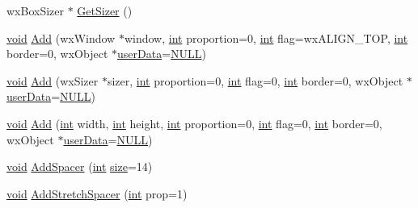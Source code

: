 \begin{DoxyCompactItemize}
\item 
wx\+Box\+Sizer $\ast$ \hyperlink{class_tool_bar_aafe722aa7397117a105aedf25ca20db0}{Get\+Sizer} ()
\item 
\hyperlink{sound_8c_ae35f5844602719cf66324f4de2a658b3}{void} \hyperlink{class_tool_bar_a3a8144425c56a59cec380131d90efa37}{Add} (wx\+Window $\ast$window, \hyperlink{xmltok_8h_a5a0d4a5641ce434f1d23533f2b2e6653}{int} proportion=0, \hyperlink{xmltok_8h_a5a0d4a5641ce434f1d23533f2b2e6653}{int} flag=wx\+A\+L\+I\+G\+N\+\_\+\+T\+OP, \hyperlink{xmltok_8h_a5a0d4a5641ce434f1d23533f2b2e6653}{int} border=0, wx\+Object $\ast$\hyperlink{xmlparse_8c_a4b666535c828e23ccd16510a0a1a1943}{user\+Data}=\hyperlink{px__mixer_8h_a070d2ce7b6bb7e5c05602aa8c308d0c4}{N\+U\+LL})
\item 
\hyperlink{sound_8c_ae35f5844602719cf66324f4de2a658b3}{void} \hyperlink{class_tool_bar_a70aae715461b4e5e4deb1e256e7430b8}{Add} (wx\+Sizer $\ast$sizer, \hyperlink{xmltok_8h_a5a0d4a5641ce434f1d23533f2b2e6653}{int} proportion=0, \hyperlink{xmltok_8h_a5a0d4a5641ce434f1d23533f2b2e6653}{int} flag=0, \hyperlink{xmltok_8h_a5a0d4a5641ce434f1d23533f2b2e6653}{int} border=0, wx\+Object $\ast$\hyperlink{xmlparse_8c_a4b666535c828e23ccd16510a0a1a1943}{user\+Data}=\hyperlink{px__mixer_8h_a070d2ce7b6bb7e5c05602aa8c308d0c4}{N\+U\+LL})
\item 
\hyperlink{sound_8c_ae35f5844602719cf66324f4de2a658b3}{void} \hyperlink{class_tool_bar_a092731cb7f09a1d28cf76d0b19aeed6e}{Add} (\hyperlink{xmltok_8h_a5a0d4a5641ce434f1d23533f2b2e6653}{int} width, \hyperlink{xmltok_8h_a5a0d4a5641ce434f1d23533f2b2e6653}{int} height, \hyperlink{xmltok_8h_a5a0d4a5641ce434f1d23533f2b2e6653}{int} proportion=0, \hyperlink{xmltok_8h_a5a0d4a5641ce434f1d23533f2b2e6653}{int} flag=0, \hyperlink{xmltok_8h_a5a0d4a5641ce434f1d23533f2b2e6653}{int} border=0, wx\+Object $\ast$\hyperlink{xmlparse_8c_a4b666535c828e23ccd16510a0a1a1943}{user\+Data}=\hyperlink{px__mixer_8h_a070d2ce7b6bb7e5c05602aa8c308d0c4}{N\+U\+LL})
\item 
\hyperlink{sound_8c_ae35f5844602719cf66324f4de2a658b3}{void} \hyperlink{class_tool_bar_a634165438c14269c68c3a866b597c73d}{Add\+Spacer} (\hyperlink{xmltok_8h_a5a0d4a5641ce434f1d23533f2b2e6653}{int} \hyperlink{group__lavu__mem_ga854352f53b148adc24983a58a1866d66}{size}=14)
\item 
\hyperlink{sound_8c_ae35f5844602719cf66324f4de2a658b3}{void} \hyperlink{class_tool_bar_aa95c2053fcdff68660b9a606dddd962d}{Add\+Stretch\+Spacer} (\hyperlink{xmltok_8h_a5a0d4a5641ce434f1d23533f2b2e6653}{int} prop=1)
\item 

\end{DoxyCompactItemize}
